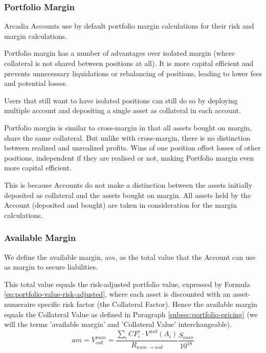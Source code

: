 \documentclass[sigconf,nonacm]{acmart}
\begin{document}
\subsubsection{Portfolio Margin}
Arcadia Accounts use by default portfolio margin calculations for their risk and margin calculations.

Portfolio margin has a number of advantages over isolated margin (where collateral is not shared between positions at all).
It is more capital efficient and prevents unnecessary liquidations or rebalancing of positions, leading to lower fees and potential losses.

Users that still want to have isolated positions can still do so by deploying multiple account and depositing a single asset as collateral in each account.

Portfolio margin is similar to cross-margin in that all assets bought on margin, share the same collateral.
But unlike with cross-margin, there is no distinction between realized and unrealized profits.
Wins of one position offset losses of other positions, independent if they are realised or not,
making Portfolio margin even more capital efficient.

This is because Accounts do not make a distinction between the assets initially deposited as collateral and the assets bought on margin.
All assets held by the Account (deposited and bought) are taken in consideration for the margin calculations.

\subsubsection{Available Margin}
\label{subsubsec:available-margin}
We define the available margin, $am$, as the total value that the Account can use as margin to secure liabilities.

This total value equals the risk-adjusted portfolio value, expressed by Formula \ref{eq:portfolio-value-risk-adjusted},
where each asset is discounted with an asset-numeraire specific risk factor (the Collateral Factor).
Hence the available margin equals the Collateral Value as defined in Paragraph \ref{subsec:portfolio-pricing}
(we will the terms 'available margin' and 'Collateral Value' interchangeable).
\begin{equation}
    \label{eq:available-margin}
    am = V_{coll}^{num} = \frac{\sum_{i}{CF_{i}^{c} \cdot V^{usd}(A_{i})}}{R_{num\rightarrow usd}}\frac{S_{num}}{10^{18}}
\end{equation}
\end{document}
